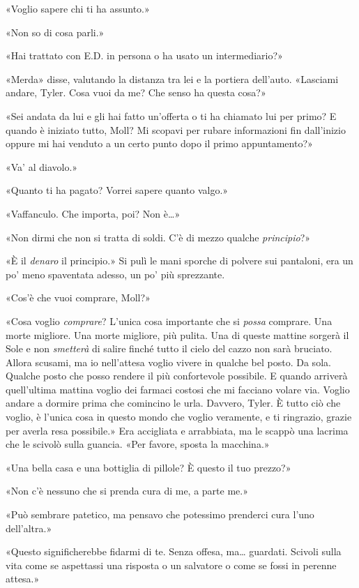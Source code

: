 «Voglio sapere chi ti ha assunto.»

«Non so di cosa parli.»

«Hai trattato con E.D. in persona o ha usato un intermediario?»

«Merda» disse, valutando la distanza tra lei e la portiera dell'auto.
«Lasciami andare, Tyler. Cosa vuoi da me? Che senso ha questa cosa?»

«Sei andata da lui e gli hai fatto un'offerta o ti ha chiamato lui per
primo? E quando è iniziato tutto, Moll? Mi scopavi per rubare
informazioni fin dall'inizio oppure mi hai venduto a un certo punto dopo
il primo appuntamento?»

«Va' al diavolo.»

«Quanto ti ha pagato? Vorrei sapere quanto valgo.»

«Vaffanculo. Che importa, poi? Non è\ldots»

«Non dirmi che non si tratta di soldi. C'è di mezzo qualche
\emph{principio}?»

«È il \emph{denaro} il principio.» Si pulì le mani sporche di polvere
sui pantaloni, era un po' meno spaventata adesso, un po' più sprezzante.

«Cos'è che vuoi comprare, Moll?»

«Cosa voglio \emph{comprare}? L'unica cosa importante che si
\emph{possa} comprare. Una morte migliore. Una morte migliore, più
pulita. Una di queste mattine sorgerà il Sole e non \emph{smetterà} di
salire finché tutto il cielo del cazzo non sarà bruciato. Allora
scusami, ma io nell'attesa voglio vivere in qualche bel posto. Da sola.
Qualche posto che posso rendere il più confortevole possibile. E quando
arriverà quell'ultima mattina voglio dei farmaci costosi che mi facciano
volare via. Voglio andare a dormire prima che comincino le urla.
Davvero, Tyler. È tutto ciò che voglio, è l'unica cosa in questo mondo
che voglio veramente, e ti ringrazio, grazie per averla resa possibile.»
Era accigliata e arrabbiata, ma le scappò una lacrima che le scivolò
sulla guancia. «Per favore, sposta la macchina.»

«Una bella casa e una bottiglia di pillole? È questo il tuo prezzo?»

«Non c'è nessuno che si prenda cura di me, a parte me.»

«Può sembrare patetico, ma pensavo che potessimo prenderci cura l'uno
dell'altra.»

«Questo significherebbe fidarmi di te. Senza offesa, ma\ldots{}
guardati. Scivoli sulla vita come se aspettassi una risposta o un
salvatore o come se fossi in perenne attesa.»

